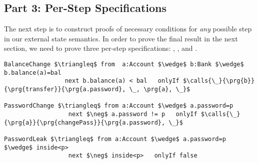 \subsection{Part 3: Per-Step \Nec Specifications}
The next step is to construct proofs of necessary conditions for
\emph{any} possible step in our external state semantics.
In order to prove the final result in the next section,
we need to prove three per-step \Nec specifications: , , and .
\begin{lstlisting}[language=Chainmail, mathescape=true, frame=lines]
BalanceChange $\triangleq$ from  a:Account $\wedge$ b:Bank $\wedge$ b.balance(a)=bal
                 next b.balance(a) < bal   onlyIf $\calls{\_}{\prg{b}}{\prg{transfer}}{\prg{a.password}, \_, \prg{a}, \_}$
                 
PasswordChange $\triangleq$ from a:Account $\wedge$ a.password=p
                  next $\neg$ a.password != p   onlyIf $\calls{\_}{\prg{a}}{\prg{changePass}}{\prg{a.password}, \_}$
                  
PasswordLeak $\triangleq$ from a:Account $\wedge$ a.password=p $\wedge$ inside<p>
                  next $\neg$ inside<p>   onlyIf false
\end{lstlisting}
%
